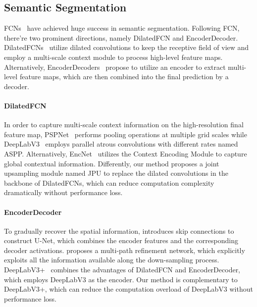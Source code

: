 \documentclass[10pt,twocolumn,letterpaper]{article}
\begin{document}
\subsection{Semantic Segmentation}
FCNs~\cite{long2015fully} have achieved huge success in semantic segmentation.
Following FCN, there're two prominent directions, namely DilatedFCN and EncoderDecoder.
DilatedFCNs~\cite{farabet2013learning,yu2015multi,chen2016attention,chen2017rethinking,zhao2017pyramid,zhang2018context,chen2018deeplab} utilize dilated convolutions to keep the receptive field of view and employ a multi-scale context module to process high-level feature maps.
Alternatively, EncoderDecoders~\cite{noh2015learning,ronneberger2015u,lin2017refinenet,amirul2017gated,peng2017large,fu2017stacked,yu2018learning,zhang2018exfuse} propose to utilize an encoder to extract multi-level feature maps, which are then combined into the final prediction by a decoder.
\vspace{-1em}
\paragraph{DilatedFCN}
In order to capture multi-scale context information on the high-resolution final feature map, PSPNet~\cite{zhao2017pyramid} performs pooling operations at multiple grid scales while DeepLabV3~\cite{chen2017rethinking} employs parallel atrous convolutions with different rates named ASPP.
Alternatively, EncNet~\cite{zhang2018context} utilizes the Context Encoding Module to capture global contextual information.
Differently, our method proposes a joint upsampling module named JPU to replace the dilated convolutions in the backbone of DilatedFCNs, which can reduce computation complexity dramatically without performance loss.
\vspace{-1em}
\paragraph{EncoderDecoder}
To gradually recover the spatial information, \cite{ronneberger2015u} introduces skip connections to construct U-Net, which combines the encoder features and the corresponding decoder activations.
\cite{lin2017refinenet} proposes a multi-path refinement network, which explicitly exploits all the information available along the down-sampling process.
DeepLabV3+~\cite{chen2018encoder} combines the advantages of DilatedFCN and EncoderDecoder, which employs DeepLabV3 as the encoder.
Our method is complementary to DeepLabV3+, which can reduce the computation overload of DeepLabV3 without performance loss.
\end{document}
